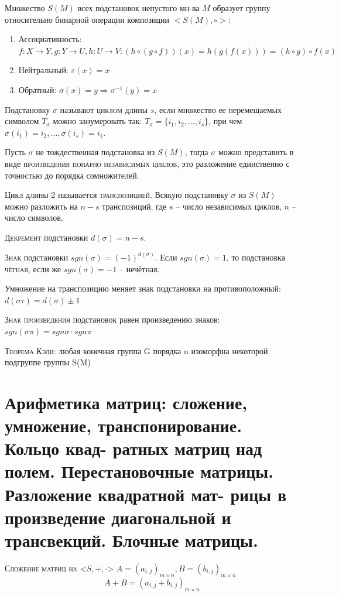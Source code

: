 \documentclass{article}
\begin{document}
Множество $S(M)$ всех подстановок непустого мн-ва $M$ образует группу относительно бинарной операции композиции $<S(M),\circ>$:
\begin{enumerate}
    \item Ассоциативность: $f\colon X\to Y, g\colon Y\to U, h\colon U\to V\colon (h\circ (g\circ f))(x)=h(g(f(x)))=(h\circ g)\circ f(x)$
    \item Нейтральный: $\varepsilon(x)=x$
    \item Обратный: $\sigma(x)=y\Rightarrow \sigma^{-1}(y)=x$
\end{enumerate}

Подстановку $\sigma$ называют \textsc{циклом} длины $s$, если множество ее перемещаемых символом $T_\sigma$ можно занумеровать так: $T_\sigma=\{i_1,i_2,\dots ,i_s\}$, при чем $\sigma(i_1)=i_2,\dots,\sigma(i_s)=i_1$.

Пусть $\sigma$ не тождественная подстановка из $S(M)$, тогда $\sigma$ можно представить в виде \textsc{произведения попарно независимых циклов}, это разложение единственно с точностью до порядка сомножителей.

Цикл длины 2 называется \textsc{транспозицией}.
Всякую подстановку $\sigma$ из $S(M)$ можно разложить на $n-s$ транспозиций, где $s$ – число независимых циклов, $n$ – число символов.

\textsc{Декремент} подстановки $d(\sigma)=n-s$.

\textsc{Знак} подстановки $sgn(\sigma)=(-1)^{d(\sigma)}$.
Если $sgn(\sigma)=1$, то подстановка \textsc{чётная}, если же $sgn(\sigma)=-1$ – нечётная.

Умножение на транспозицию меняет знак подстановки на противоположный:
$d(\sigma\tau)=d(\sigma)\pm 1$

\textsc{Знак произведения} подстановок равен произведению знаков:
$sgn(\sigma\pi)=sgn\sigma \cdot sgn\pi$

\textsc{Теорема Кэли:} любая конечная группа G порядка n изоморфна некоторой подгруппе группы S(M)

\section{Арифметика матриц: сложение, умножение, транспонирование. Кольцо квад- ратных матриц над полем. Перестановочные матрицы. Разложение квадратной мат- рицы в произведение диагональной и трансвекций. Блочные матрицы.}

\textsc{Сложение матриц на {<$S, +, \cdot$>}} $A=(a_{i,j})_{m\times n}, B=(b_{i,j})_{m\times n}$
$$A+B=(a_{i,j}+b_{i,j})_{m\times n}$$
\end{document}

